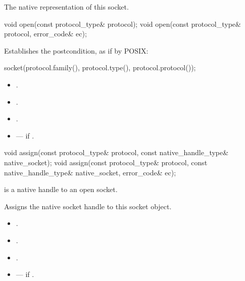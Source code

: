 \begin{itemdescr}
\pnum
\returns The native representation of this socket.
\end{itemdescr}

\begin{itemdecl}
void open(const protocol_type& protocol);
void open(const protocol_type& protocol, error_code& ec);
\end{itemdecl}

\begin{itemdescr}
\pnum
\effects Establishes the postcondition, as if by POSIX:
\begin{codeblock}
socket(protocol.family(), protocol.type(), protocol.protocol());
\end{codeblock}

\pnum
\postconditions
\begin{itemize}
\item
{}.
\item
{}.
\item
{}.
\end{itemize}

\pnum
\errors
\begin{itemize}
\item
{} --- if .
\end{itemize}
\end{itemdescr}

\begin{itemdecl}
void assign(const protocol_type& protocol,
            const native_handle_type& native_socket);
void assign(const protocol_type& protocol,
            const native_handle_type& native_socket, error_code& ec);
\end{itemdecl}

\begin{itemdescr}
\pnum
\requires {} is a native handle to an open socket.

\pnum
\effects Assigns the native socket handle to this socket object.

\pnum
\postconditions
\begin{itemize}
\item
{}.
\item
{}.
\item
{}.
\end{itemize}

\pnum
\errors
\begin{itemize}
\item
{} --- if .
\end{itemize}
\end{itemdescr}

